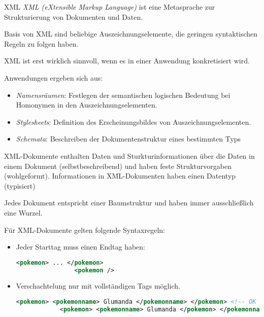 \begin{defi}{XML}
    \emph{XML (eXtensible Markup Language)} ist eine Metasprache zur Strukturierung von Dokumenten und Daten.
    
    Basis von XML sind beliebige Auszeichnungselemente, die geringen syntaktischen Regeln zu folgen haben.
    
    XML ist erst wirklich sinnvoll, wenn es in einer Anwendung konkretisiert wird.
    
    Anwendungen ergeben sich aus:
    \begin{itemize}
        \item \emph{Namensräumen}:
              Festlegen der semantischen logischen Bedeutung bei Homonymen in den Auszeichnungselementen.
        \item \emph{Stylesheets}:
              Definition des Erscheinungsbildes von Auszeichnungselementen.
        \item \emph{Schemata}:
              Beschreiben der Dokumentenstruktur eines bestimmten Typs
    \end{itemize}
    
    XML-Dokumente enthalten Daten und Sturkturinformationen über die Daten in einem Dokument (selbstbeschreibend) und haben feste Strukturvorgaben (wohlgeformt).
    Informationen in XML-Dokumenten haben einen Datentyp (typisiert)
    
    Jedes Dokument entspricht einer Baumstruktur und haben immer ausschließlich eine Wurzel.
    
    Für XML-Dokumente gelten folgende Syntaxregeln:
    
    \begin{itemize}
        \item Jeder Starttag muss einen Endtag haben:
              
              \begin{lstlisting}[language=XML]
                <pokemon> ... </pokemon>
                <pokemon />
            \end{lstlisting}
        \item Verschachtelung nur mit vollständigen Tags möglich.
              
              \begin{lstlisting}[language=XML]
            <pokemon> <pokemonname> Glumanda </pokemonname> </pokemon> <!-- OK -->
            <pokemon> <pokemonname> Glumanda </pokemon> </pokemonname>  <!-- NOT OK -->
            \end{lstlisting}
    \end{itemize}
\end{defi}

